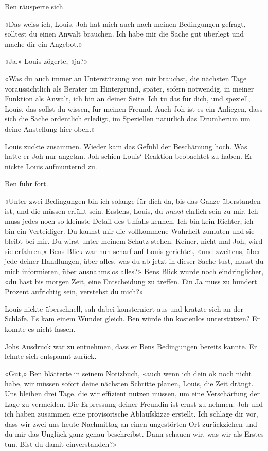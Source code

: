 Ben räusperte sich.

«Das weiss ich, Louis. Joh hat mich auch nach meinen Bedingungen
gefragt, solltest du einen Anwalt brauchen. Ich habe mir die Sache gut
überlegt und mache dir ein Angebot.»

«Ja,» Louis zögerte, «ja?»

«Was du auch immer an Unterstützung von mir brauchst, die nächsten Tage
voraussichtlich als Berater im Hintergrund, später, sofern notwendig, in
meiner Funktion als Anwalt, ich bin an deiner Seite. Ich tu das für
dich, und speziell, Louis, das sollst du wissen, für meinen Freund. Auch
Joh ist es ein Anliegen, dass sich die Sache ordentlich erledigt, im
Speziellen natürlich das Drumherum um deine Anstellung hier oben.»

Louis zuckte zusammen. Wieder kam das Gefühl der Beschämung hoch. Was
hatte er Joh nur angetan. Joh schien Louis` Reaktion beobachtet zu
haben. Er nickte Louis aufmunternd zu.

Ben fuhr fort.

«Unter zwei Bedingungen bin ich solange für dich da, bis das Ganze
überstanden ist, und die müssen erfüllt sein. Erstens, Louis, du
\emph{musst} ehrlich sein zu mir. Ich muss jedes noch so kleinste Detail
des Unfalls kennen. Ich bin kein Richter, ich bin ein Verteidiger. Du
kannst mir die vollkommene Wahrheit zumuten und sie bleibt bei mir. Du
wirst unter meinem Schutz stehen. Keiner, nicht mal Joh, wird sie
erfahren,» Bens Blick war nun scharf auf Louis gerichtet, «und zweitens,
über jede deiner Handlungen, über alles, was du ab jetzt in dieser Sache
tust, musst du mich informieren, über ausnahmslos alles?» Bens Blick
wurde noch eindringlicher, «du hast bis morgen Zeit, eine Entscheidung
zu treffen. Ein Ja muss zu hundert Prozent aufrichtig sein, verstehst du
mich?»

Louis nickte überschnell, sah dabei konsterniert aus und kratzte sich an
der Schläfe. Es kam einem Wunder gleich. Ben würde ihn kostenlos
unterstützen? Er konnte es nicht fassen.

Johs Ausdruck war zu entnehmen, dass er Bens Bedingungen bereits kannte.
Er lehnte sich entspannt zurück.

«Gut,» Ben blätterte in seinem Notizbuch, «auch wenn ich dein ok noch
nicht habe, wir müssen sofort deine nächsten Schritte planen, Louis, die
Zeit drängt. Uns bleiben drei Tage, die wir effizient nutzen müssen, um
eine Verschärfung der Lage zu vermeiden. Die Erpressung deiner Freundin
ist ernst zu nehmen. Joh und ich haben zusammen eine provisorische
Ablaufskizze erstellt. Ich schlage dir vor, dass wir zwei uns heute
Nachmittag an einen ungestörten Ort zurückziehen und du mir das Unglück
ganz genau beschreibst. Dann schauen wir, was wir als Erstes tun. Bist
du damit einverstanden?»

